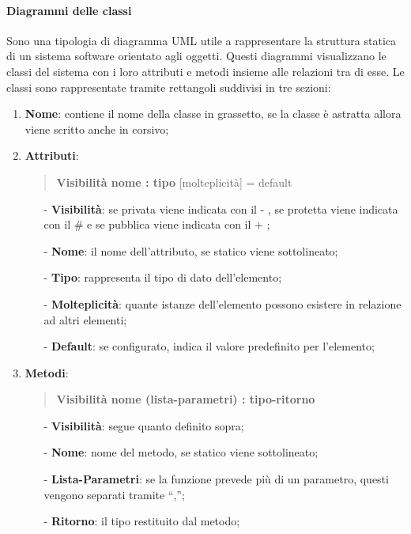     \paragraph{Diagrammi delle classi}
    Sono una tipologia di diagramma UML utile a rappresentare la struttura statica di un sistema software orientato agli oggetti. Questi diagrammi visualizzano le classi del sistema con i loro attributi e metodi insieme alle relazioni tra di esse.\newline
    Le classi sono rappresentate tramite rettangoli suddivisi in tre sezioni: 
    \begin{enumerate}
        \item \textbf{Nome}: contiene il nome della classe in grassetto, se la classe è astratta allora viene scritto anche in corsivo;
        \item \textbf{Attributi}:
        \begin{quote}
            \textbf{Visibilità nome : tipo} [molteplicità] = default
        \end{quote}
        \begin{itemize}
            \item [-] \textbf{Visibilità}: se privata viene indicata con il - , se protetta viene indicata con il \# e se pubblica viene indicata con il + ;
            \item [-] \textbf{Nome}: il nome dell’attributo, se statico viene sottolineato;
            \item [-] \textbf{Tipo}: rappresenta il tipo di dato dell’elemento;
            \item [-] \textbf{Molteplicità}: quante istanze dell’elemento possono esistere in relazione ad altri elementi;
            \item [-] \textbf{Default}: se configurato, indica il valore predefinito per l’elemento;
        \end{itemize}
        
        \item \textbf{Metodi}:
        \begin{quote}
            \textbf{Visibilità nome (lista-parametri) : tipo-ritorno}
        \end{quote}
        \begin{itemize}
            \item [-] \textbf{Visibilità}: segue quanto definito sopra;
            \item [-] \textbf{Nome}: nome del metodo, se statico viene sottolineato;
            \item [-] \textbf{Lista-Parametri}: se la funzione prevede più di un parametro, questi vengono separati tramite “,”;
            \item [-] \textbf{Ritorno}: il tipo restituito dal metodo;
        \end{itemize}
    \end{enumerate}
